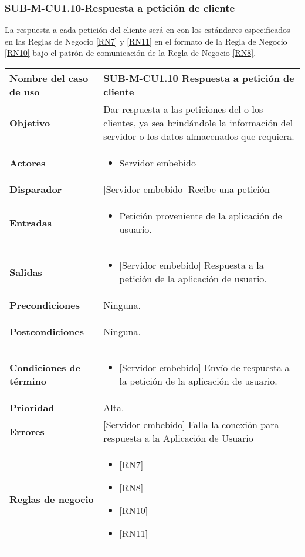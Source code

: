 \subsubsection{SUB-M-CU1.10-Respuesta a petición de cliente}\label{SUB-M-CU1.10}
La respuesta a cada petición del cliente será en con los estándares especificados en las Reglas de Negocio \ref{RN7} y \ref{RN11} en el formato de la Regla de Negocio \ref{RN10} bajo el patrón de comunicación de la Regla de Negocio \ref{RN8}.

\begin{longtable}{|J{5cm}|J{10.3cm}|}
	\hline
	\textbf{Nombre del caso de uso} &
		SUB-M-CU1.10 Respuesta a petición de cliente\\ \hline
	\textbf{Objetivo} &
		Dar respuesta a las peticiones del o los clientes, ya sea brindándole la información del servidor o los datos almacenados que requiera. \\ \hline
	\textbf{Actores} &
		\begin{itemize}
		    \item Servidor embebido
		\end{itemize}\\ \hline 
	\textbf{Disparador} & 
	     {[Servidor embebido]} Recibe una petición\\ \hline 
	\textbf{Entradas} & 
		\begin{itemize}
				\item Petición proveniente de la aplicación de usuario.
		\end{itemize}\\ \hline 
	\textbf{Salidas} & 
		\begin{itemize}
			\item {[Servidor embebido]} Respuesta a la petición de la aplicación de usuario.
		\end{itemize} \\ \hline
	\textbf{Precondiciones} &
		Ninguna.\\ \hline
	\textbf{Postcondiciones} &
		\begin{itemize}
			Ninguna.
		\end{itemize}\\ \hline
	\textbf{Condiciones de término} & 
		\begin{itemize}
			\item {[Servidor embebido]} Envío de respuesta a la petición de la aplicación de usuario.
		\end{itemize} \\ \hline 
	\textbf{Prioridad} & 
		Alta. \\ \hline
	\textbf{Errores} & 
	    \item {[Servidor embebido]} Falla la conexión para respuesta a la Aplicación de Usuario
		\\ \hline
	\textbf{Reglas de negocio} & 
		\begin{itemize}
			\item \ref{RN7}
			\item \ref{RN8}
			\item \ref{RN10}
			\item \ref{RN11}
		\end{itemize} \\ \hline


\end{longtable}
